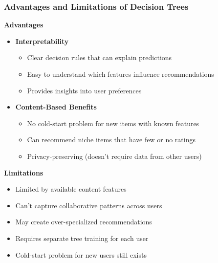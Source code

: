 \documentclass{beamer}
\begin{document}
\begin{frame}
\frametitle{Advantages and Limitations of Decision Trees}

\textbf{Advantages}
\begin{itemize}
    \item \textbf{Interpretability}
    \begin{itemize}
        \item Clear decision rules that can explain predictions
        \item Easy to understand which features influence recommendations
        \item Provides insights into user preferences
    \end{itemize}
    
    \item \textbf{Content-Based Benefits}
    \begin{itemize}
        \item No cold-start problem for new items with known features
        \item Can recommend niche items that have few or no ratings
        \item Privacy-preserving (doesn't require data from other users)
    \end{itemize}
\end{itemize}

\textbf{Limitations}
\begin{itemize}
    \item Limited by available content features
    \item Can't capture collaborative patterns across users
    \item May create over-specialized recommendations
    \item Requires separate tree training for each user
    \item Cold-start problem for new users still exists
\end{itemize}
\end{frame}
\end{document}
